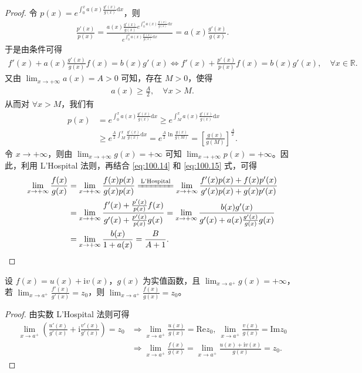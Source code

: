 \documentclass[../../main.tex]{subfiles}
\begin{document}
\begin{proof}
令 \(p(x) = e^{\int_0^x a(x) \frac{g'(x)}{g(x)} \mathrm{d}x}\)，则
\begin{align}
\frac{p'(x)}{p(x)} = \frac{a(x) \frac{g'(x)}{g(x)} e^{\int_0^x a(x) \frac{g'(x)}{g(x)} \mathrm{d}x}}{e^{\int_0^x a(x) \frac{g'(x)}{g(x)} \mathrm{d}x}} = a(x) \frac{g'(x)}{g(x)}. \label{eq:100.14}
\end{align}
于是由条件可得
\begin{align}
f'(x) + a(x) \frac{g'(x)}{g(x)} f(x) = b(x) g'(x) \Longleftrightarrow f'(x) + \frac{p'(x)}{p(x)} f(x) = b(x) g'(x), \quad \forall x \in \mathbb{R}. \label{eq:100.15}
\end{align}
又由 \(\lim_{x \to +\infty} a(x) = A > 0\) 可知，存在 \(M > 0\)，使得
\begin{align*}
a(x) \geqslant \frac{A}{2}, \quad \forall x > M.
\end{align*}
从而对 \(\forall x > M\)，我们有
\begin{align*}
p(x) &= e^{\int_0^x a(x) \frac{g'(x)}{g(x)} \mathrm{d}x} \geqslant e^{\int_M^x a(x) \frac{g'(x)}{g(x)} \mathrm{d}x} \\
&\geqslant e^{\frac{A}{2} \int_M^x \frac{g'(x)}{g(x)} \mathrm{d}x} = e^{\frac{A}{2} \ln \frac{g(x)}{g(M)}} = \left[ \frac{g(x)}{g(M)} \right]^{\frac{A}{2}}.
\end{align*}
令 \(x \to +\infty\)，则由 \(\lim_{x \to +\infty} g(x) = +\infty\) 可知 \(\lim_{x \to +\infty} p(x) = +\infty\)。因此，利用 L'Hospital 法则，再结合 \eqref{eq:100.14} 和 \eqref{eq:100.15} 式，可得
\begin{align*}
\lim_{x \to +\infty} \frac{f(x)}{g(x)} &= \lim_{x \to +\infty} \frac{f(x) p(x)}{g(x) p(x)} \xlongequal{\text{L'Hospital}} \lim_{x \to +\infty} \frac{f'(x) p(x) + f(x) p'(x)}{g'(x) p(x) + g(x) p'(x)} \\
&= \lim_{x \to +\infty} \frac{f'(x) + \frac{p'(x)}{p(x)} f(x)}{g'(x) + \frac{p'(x)}{p(x)} g(x)} = \lim_{x \to +\infty} \frac{b(x) g'(x)}{g'(x) + a(x) \frac{g'(x)}{g(x)} g(x)} \\
&= \lim_{x \to +\infty} \frac{b(x)}{1 + a(x)} = \frac{B}{A + 1}.
\end{align*}
\end{proof}

\begin{proposition}\label{proposition:L'Hospital法则(复变函数版本)}
设 \( f(x) = u(x) + \mathrm{i} v(x) \)，\( g(x) \) 为实值函数，且 \( \lim_{x \to a^+} g(x) = +\infty \)，若 \( \lim_{x \to a^+} \frac{f'(x)}{g'(x)} = z_0 \)，则 \( \lim_{x \to a^+} \frac{f(x)}{g(x)} = z_0 \)。
\end{proposition}
\begin{proof}
由实数 L’Hospital 法则可得
\begin{align*}
\lim_{x \to a^+} \left( \frac{u'(x)}{g'(x)} + \mathrm{i} \frac{v'(x)}{g'(x)} \right) = z_0 &\Rightarrow \lim_{x \to a^+} \frac{u(x)}{g(x)} = \mathrm{Re} z_0,\ \lim_{x \to a^+} \frac{v(x)}{g(x)} = \mathrm{Im} z_0 \\
&\Rightarrow \lim_{x \to a^+} \frac{f(x)}{g(x)} = \lim_{x \to a^+} \frac{u(x) + \mathrm{i} v(x)}{g(x)} = z_0.
\end{align*} 
\end{proof}
\end{document}
